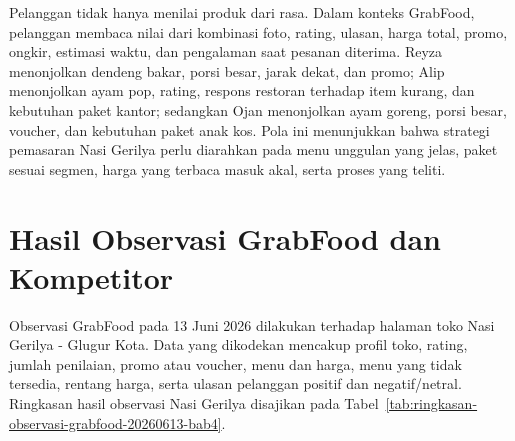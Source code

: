 Pelanggan tidak hanya menilai produk dari rasa. Dalam konteks GrabFood, pelanggan membaca nilai dari kombinasi foto, rating, ulasan, harga total, promo, ongkir, estimasi waktu, dan pengalaman saat pesanan diterima. Reyza menonjolkan dendeng bakar, porsi besar, jarak dekat, dan promo; Alip menonjolkan ayam pop, rating, respons restoran terhadap item kurang, dan kebutuhan paket kantor; sedangkan Ojan menonjolkan ayam goreng, porsi besar, voucher, dan kebutuhan paket anak kos. Pola ini menunjukkan bahwa strategi pemasaran Nasi Gerilya perlu diarahkan pada menu unggulan yang jelas, paket sesuai segmen, harga yang terbaca masuk akal, serta proses yang teliti.

\section{Hasil Observasi GrabFood dan Kompetitor}
Observasi GrabFood pada 13 Juni 2026 dilakukan terhadap halaman toko Nasi Gerilya - Glugur Kota. Data yang dikodekan mencakup profil toko, rating, jumlah penilaian, promo atau voucher, menu dan harga, menu yang tidak tersedia, rentang harga, serta ulasan pelanggan positif dan negatif/netral. Ringkasan hasil observasi Nasi Gerilya disajikan pada Tabel~\ref{tab:ringkasan-observasi-grabfood-20260613-bab4}.

